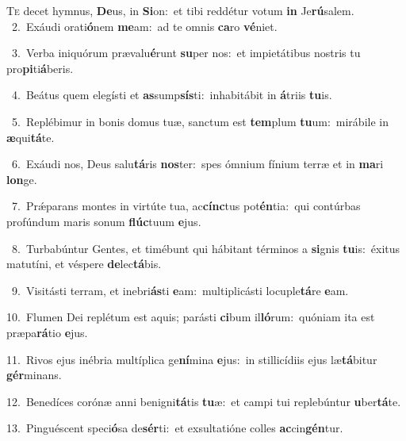 \lettrine{\initial\textcolor{\initialcolor}{T}}{e} decet hymnus, \textbf{De}\-us, in \textbf{Si}\-on:~\star et tibi reddétur votum \textbf{in} Je\-\textbf{rú}\-salem.\\
{\numbfont\textcolor{\numbcolor}{~2.}}~Exáudi orati\-\textbf{ó}\-nem \textbf{me}\-am:~\star ad te omnis \textbf{ca}\-ro \textbf{vé}\-niet.\par
{\numbfont\textcolor{\numbcolor}{~3.}}~Verba iniquórum prævalu\-\textbf{é}\-runt \textbf{su}\-per nos:~\star et impietátibus nostris tu pro\-\textbf{pi}\-ti\-\textbf{á}\-beris.\par
{\numbfont\textcolor{\numbcolor}{~4.}}~Beátus quem elegísti et \textbf{as}\-sump\-\textbf{sís}\-ti:~\star inhabitábit in \textbf{á}\-triis \textbf{tu}\-is.\par
{\numbfont\textcolor{\numbcolor}{~5.}}~Replébimur in bonis domus tuæ, sanctum est \textbf{tem}\-plum \textbf{tu}\-um:~\star mirábile in \textbf{æ}\-qui\-\textbf{tá}\-te.\par
{\numbfont\textcolor{\numbcolor}{~6.}}~Exáudi nos, Deus salu\-\textbf{tá}\-ris \textbf{nos}\-ter:~\star spes ómnium fínium terræ et in \textbf{ma}\-ri \textbf{lon}\-ge.\par
{\numbfont\textcolor{\numbcolor}{~7.}}~Prǽparans montes in virtúte tua, ac\-\textbf{cínc}\-tus pot\-\textbf{én}\-tia:~\star qui contúrbas profúndum maris sonum \textbf{flúc}\-tuum \textbf{e}\-jus.\par
{\numbfont\textcolor{\numbcolor}{~8.}}~Turbabúntur Gentes, et timébunt qui hábitant términos a \textbf{si}\-gnis \textbf{tu}\-is:~\star éxitus matutíni, et véspere \textbf{de}\-lec\-\textbf{tá}\-bis.\par
{\numbfont\textcolor{\numbcolor}{~9.}}~Visitásti terram, et inebri\-\textbf{ás}\-ti \textbf{e}\-am:~\star multiplicásti locuple\-\textbf{tá}\-re \textbf{e}\-am.\par
{\numbfont\textcolor{\numbcolor}{10.}}~Flumen Dei replétum est aquis; parásti \textbf{ci}\-bum il\-\textbf{ló}\-rum:~\star quóniam ita est præpa\-\textbf{rá}\-tio \textbf{e}\-jus.\par
{\numbfont\textcolor{\numbcolor}{11.}}~Rivos ejus inébria multíplica ge\-\textbf{ní}\-mina \textbf{e}\-jus:~\star in stillicídiis ejus læ\-\textbf{tá}\-bitur \textbf{gér}\-minans.\par
{\numbfont\textcolor{\numbcolor}{12.}}~Benedíces corónæ anni benigni\-\textbf{tá}\-tis \textbf{tu}\-æ:~\star et campi tui replebúntur \textbf{u}\-ber\-\textbf{tá}\-te.\par
{\numbfont\textcolor{\numbcolor}{13.}}~Pinguéscent speci\-\textbf{ó}\-sa de\-\textbf{sér}\-ti:~\star et exsultatióne colles \textbf{ac}\-cin\-\textbf{gén}\-tur.\par
